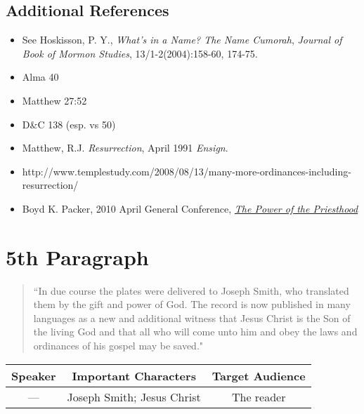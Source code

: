 \documentclass[12pt]{report}
\begin{document}
\subsection{Additional References\label{intro:references4}}
\begin{itemize}
\item See Hoskisson, P. Y., \emph{What's in a Name? The Name \emph{Cumorah}}, \emph{Journal of Book of Mormon Studies}, 13/1-2(2004):158-60, 174-75.
\item Alma 40
\item Matthew 27:52
\item D\&C 138 (esp. vs 50)
\item Matthew, R.J. \emph{Resurrection}, April 1991 \emph{Ensign}.
\item http://www.templestudy.com/2008/08/13/many-more-ordinances-including-resurrection/
\item Boyd K. Packer, 2010 April General Conference, \href{https://www.lds.org/general-conference/2010/04/the-power-of-the-priesthood?lang=eng}{\emph{The Power of the Priesthood}}
\end{itemize}

\section{5th Paragraph\label{intro:5th}}
\begin{center}
\begin{quote}
``In due course the plates were delivered to Joseph Smith, who translated them by the gift and power of God.  The record is now published in many languages as a new and additional witness that Jesus Christ is the Son of the living God and that all who will come unto him and obey the laws and ordinances of his gospel may be saved."
\end{quote}
\end{center}

\begin{table}[h!]
\centering
\label{table:intro5}
\begin{tabular*}{\textwidth}{c @{\extracolsep{\fill}}cc}
Speaker & Important Characters & Target Audience \\
\hline
\rule{0pt}{3ex}--- & Joseph Smith; Jesus Christ & The reader 
\end{tabular*}
\end{table}
\end{document}
